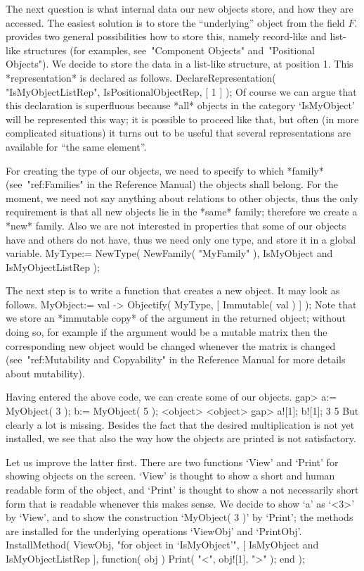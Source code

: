 The next question is what internal data our new objects store,
and how they are accessed.
The easiest solution is to store the ``underlying'' object from the
field $F$.
{\GAP} provides two general possibilities how to store this,
namely record-like and list-like structures
(for examples, see~"Component Objects" and~"Positional Objects").
We decide to store the data in a list-like structure, at position 1.
This *representation* is declared as follows.
\begintt
DeclareRepresentation( "IsMyObjectListRep", IsPositionalObjectRep, [ 1 ] );
\endtt
Of course we can argue that this declaration is superfluous
because *all* objects in the category `IsMyObject' will be represented
this way;
it is possible to proceed like that,
but often (in more complicated situations) it turns out to be useful 
that several representations are available for ``the same element''.

For creating the type of our objects, we need to specify to which *family*
(see~"ref:Families" in the Reference Manual) the objects shall belong.
For the moment, we need not say anything about relations to other {\GAP}
objects,
thus the only requirement is that all new objects lie in the *same* family;
therefore we create a *new* family.
Also we are not interested in properties that some of our objects have
and others do not have,
thus we need only one type,
and store it in a global variable.
\begintt
MyType:= NewType( NewFamily( "MyFamily" ),
                  IsMyObject and IsMyObjectListRep );
\endtt

The next step is to write a function that creates a new object.
It may look as follows.
\begintt
MyObject:= val -> Objectify( MyType, [ Immutable( val ) ] );
\endtt
Note that we store an *immutable copy* of the argument in the returned
object;
without doing so, for example if the argument would be a mutable matrix
then the corresponding new object would be changed whenever the matrix
is changed
(see~"ref:Mutability and Copyability" in the Reference Manual for more
details about mutability).

Having entered the above {\GAP} code, we can create some of our objects.
\begintt
gap> a:= MyObject( 3 );  b:= MyObject( 5 );
<object>
<object>
gap> a![1];  b![1];
3
5
\endtt
But clearly a lot is missing.
Besides the fact that the desired multiplication is not yet installed,
we see that also the way how the objects are printed is not satisfactory.

Let us improve the latter first.
There are two {\GAP} functions `View' and `Print' for showing objects
on the screen.
`View' is thought to show a short and human readable form of the object,
and `Print' is thought to show a not necessarily short form that is
{\GAP} readable whenever this makes sense.
We decide to show `a' as `<3>' by `View', and to show the construction
`MyObject( 3 )' by `Print';
the methods are installed for the underlying operations `ViewObj' and
`PrintObj'.
\begintt
InstallMethod( ViewObj,
    "for object in `IsMyObject'",
    [ IsMyObject and IsMyObjectListRep ],
    function( obj )
    Print( "<", obj![1], ">" );
    end );

